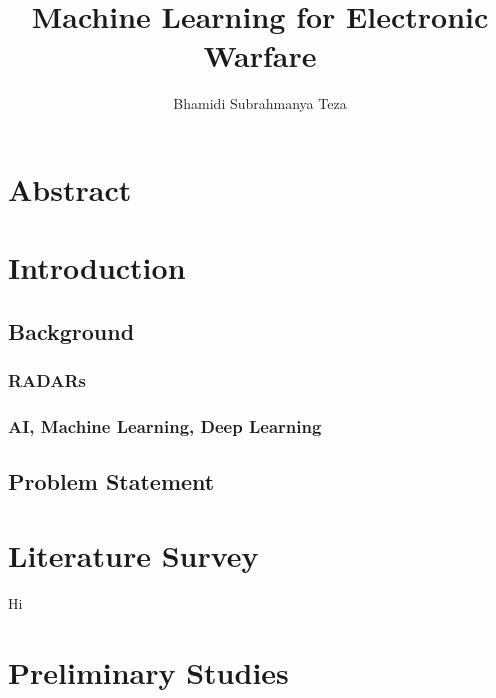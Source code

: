 \documentclass[department=ai,degree=phd,book=proposal,backref=page,spacing=single]{common/iiththesis}
\title{Machine Learning for Electronic Warfare}
\author{Bhamidi Subrahmanya Teza}
\begin{document}
\hypertarget{abstract}{%
\section*{Abstract}\label{abstract}}

\newpage{}

\hypertarget{introduction}{%
\section*{Introduction}\label{introduction}}

\hypertarget{background}{%
\subsection{Background}\label{background}}

\hypertarget{radars}{%
\subsubsection{RADARs}\label{radars}}

\hypertarget{ai-machine-learning-deep-learning}{%
\subsubsection{AI, Machine Learning, Deep
Learning}\label{ai-machine-learning-deep-learning}}

\hypertarget{problem-statement}{%
\subsection{Problem Statement}\label{problem-statement}}

\newpage{}

\hypertarget{literature-survey}{%
\section*{Literature Survey}\label{literature-survey}}

Hi \autocite{Aho:book:2006}

\newpage{}

\hypertarget{preliminary-studies}{%
\section*{Preliminary Studies}\label{preliminary-studies}}
\end{document}
